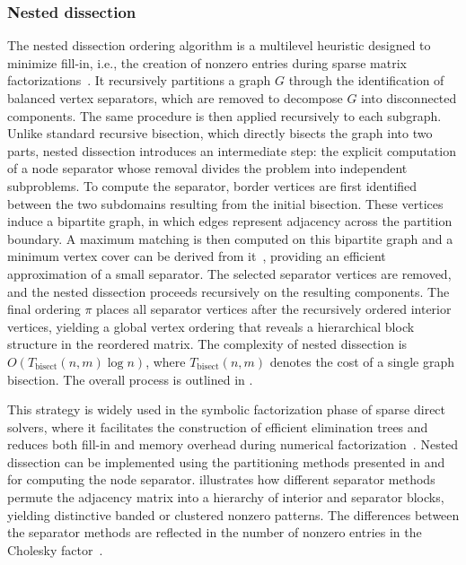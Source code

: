     \subsubsection{Nested dissection}
    The nested dissection ordering algorithm is a multilevel heuristic designed to minimize fill-in, i.e., the creation of nonzero entries during sparse matrix factorizations~\cite{George73}.
    It recursively partitions a graph $G$ through the identification of balanced vertex separators, which are removed to decompose $G$ into disconnected components. The same procedure is then applied recursively to each subgraph.
    Unlike standard recursive bisection, which directly bisects the graph into two parts, nested dissection introduces an intermediate step: the explicit computation of a node separator whose removal divides the problem into independent subproblems.
    To compute the separator, border vertices are first identified between the two subdomains resulting from the initial bisection. These vertices induce a bipartite graph, in which edges represent adjacency across the partition boundary. A maximum matching is then computed on this bipartite graph and a minimum vertex cover can be derived from it~\cite{bondy1976graph, storer2012introduction}, providing an efficient approximation of a small separator. The selected separator vertices are removed, and the nested dissection proceeds recursively on the resulting components.
    The final ordering $\pi$ places all separator vertices after the recursively ordered interior vertices, yielding a global vertex ordering that reveals a hierarchical block structure in the reordered matrix.
    The complexity of nested dissection is $O(T_{\text{bisect}}(n,m) \log n)$, where $T_{\text{bisect}}(n,m)$ denotes the cost of a single graph bisection.
    The overall process is outlined in .

    This strategy is widely used in the symbolic
    factorization phase of sparse direct solvers, where it
    facilitates the construction of efficient elimination
    trees and reduces both fill-in and memory overhead
    during numerical factorization~\cite{Bollhöfer2020}.
    Nested dissection can be implemented using the
    partitioning methods presented in 
    and  for computing the node
    separator.  illustrates how
    different separator methods permute the adjacency
    matrix into a
    hierarchy of interior and separator blocks, yielding
    distinctive banded or clustered nonzero patterns.
    The differences between the separator methods are
    reflected in the number of nonzero entries in the
    Cholesky factor~\cite{George73}.
    
